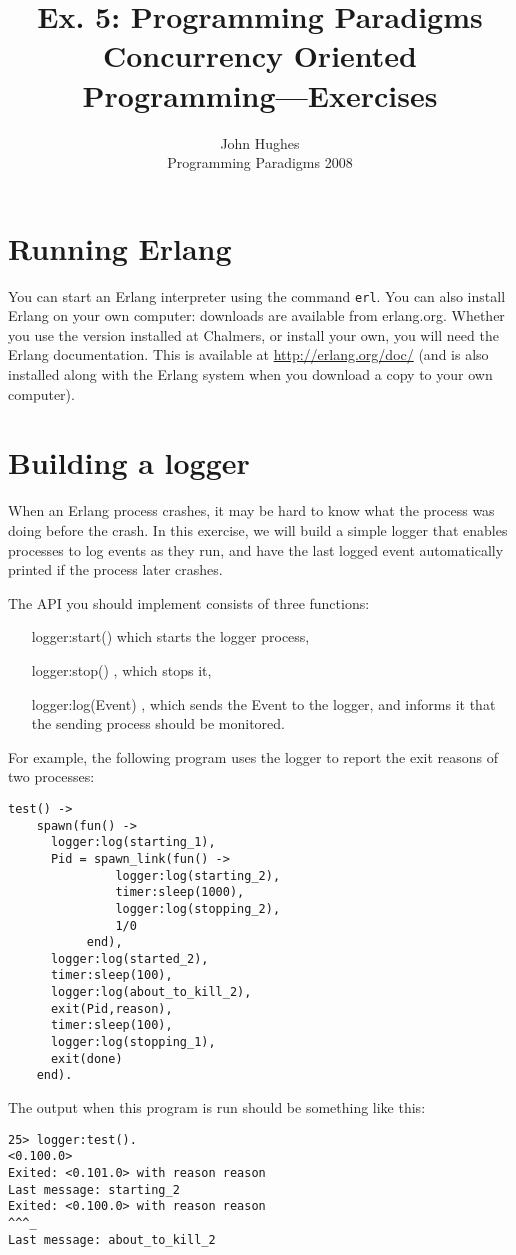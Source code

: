 \documentclass{article}
\newcommand{\courseinfo}{ John Hughes \\ Programming Paradigms 2008 }
\begin{document}
\title{Ex. 5: Programming Paradigms 
\\
Concurrency Oriented Programming—Exercises}
\author{\courseinfo}
\date{}
\maketitle

\section{Running Erlang}

You can start an Erlang interpreter using the command \verb!erl!. You can also install Erlang on your own computer: downloads are available from erlang.org. Whether you use the version installed at Chalmers, or install your own, you will need the Erlang documentation. This is available at \url{http://erlang.org/doc/} (and is also installed along with the Erlang system when you download a copy to your own computer).


\section{Building a logger}

When an Erlang process crashes, it may be hard to know what the
process was doing before the crash. In this exercise, we will build a
simple logger that enables processes to log events as they run, and
have the last logged event automatically printed if the process later
crashes.

The API you should implement consists of three functions:

\begin{itemize}
\item[logger:start()] which starts the logger process,
\item[logger:stop()], which stops it,
\item[logger:log(Event)], which sends the Event to the logger, and informs it that the sending process should be monitored.
\end{itemize}

For example, the following program uses the logger to report the exit reasons of two processes:
\begin{verbatim}
test() ->
    spawn(fun() ->
	  logger:log(starting_1),
	  Pid = spawn_link(fun() ->
			   logger:log(starting_2),
			   timer:sleep(1000),
			   logger:log(stopping_2),
			   1/0
		   end),
	  logger:log(started_2),
	  timer:sleep(100),
	  logger:log(about_to_kill_2),
	  exit(Pid,reason),
	  timer:sleep(100),
	  logger:log(stopping_1),
	  exit(done)
	end).
\end{verbatim}
The output when this program is run should be something  like this:
\begin{verbatim}
25> logger:test().
<0.100.0>
Exited: <0.101.0> with reason reason
Last message: starting_2
Exited: <0.100.0> with reason reason
^^^_
Last message: about_to_kill_2
\end{verbatim}
\end{document}
